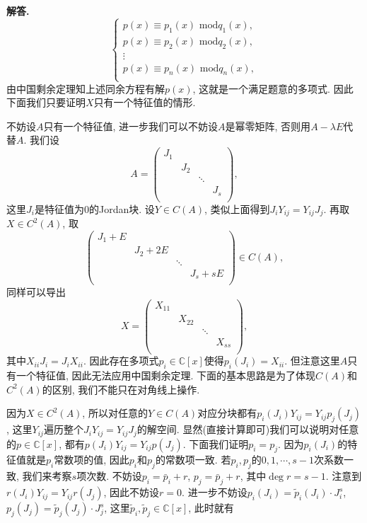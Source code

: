 \documentclass{article}
\newenvironment{solution}{\par\noindent\textbf{解答. }}{\par}
\begin{document}
\begin{solution}
$$
\begin{cases}
	p\left( x \right) \equiv p_1\left( x \right) \,\,\mathrm{mod}q_1\left( x \right) ,\\
	p\left( x \right) \equiv p_2\left( x \right) \,\,\mathrm{mod}q_2\left( x \right) ,\\
	\vdots\\
	p\left( x \right) \equiv p_n\left( x \right) \,\,\mathrm{mod}q_n\left( x \right) ,\\
\end{cases}
$$
由中国剩余定理知上述同余方程有解$p(x)$, 这就是一个满足题意的多项式. 因此下面我们只要证明$X$只有一个特征值的情形.\par
不妨设$A$只有一个特征值, 进一步我们可以不妨设$A$是幂零矩阵, 否则用$A-\lambda E$代替$A$. 我们设
$$
A=\left( \begin{matrix}
	J_1&		&		&		\\
	&		J_2&		&		\\
	&		&		\ddots&		\\
	&		&		&		J_s\\
\end{matrix} \right) ,
$$
这里$J_i$是特征值为$0$的Jordan块. 设$Y\in C(A)$, 类似上面得到$J_iY_{ij}=Y_{ij}J_j$. 再取$X\in C^2(A)$, 取
$$
\left( \begin{matrix}
	J_1+E&		&		&		\\
	&		J_2+2E&		&		\\
	&		&		\ddots&		\\
	&		&		&		J_s+sE\\
\end{matrix} \right) \in C\left( A \right) ,
$$
同样可以导出
$$
X=\left( \begin{matrix}
	X_{11}&		&		&		\\
	&		X_{22}&		&		\\
	&		&		\ddots&		\\
	&		&		&		X_{ss}\\
\end{matrix} \right) ,
$$
其中$X_{ii}J_i=J_iX_{ii}$. 因此存在多项式$p_i\in\mathbb{C}[x]$使得$p_i(J_i)=X_{ii}$. 但注意这里$A$只有一个特征值, 因此无法应用中国剩余定理. 下面的基本思路是为了体现$C(A)$和$C^2(A)$的区别, 我们不能只在对角线上操作.\par
因为$X\in C^2(A)$, 所以对任意的$Y\in C(A)$对应分块都有$p_i(J_i)Y_{ij}=Y_{ij}p_j(J_j)$, 这里$Y_{ij}$遍历整个$J_iY_{ij}=Y_{ij}J_j$的解空间. 显然(直接计算即可)我们可以说明对任意的$p\in\mathbb{C}[x]$, 都有$p(J_i)Y_{ij}=Y_{ij}p(J_j)$. 下面我们证明$p_i=p_j$. 因为$p_i(J_i)$的特征值就是$p_i$常数项的值, 因此$p_i$和$p_j$的常数项一致. 若$p_i,p_j$的$0,1,\cdots,s-1$次系数一致, 我们来考察$s$项次数. 不妨设$p_i=\bar{p}_i+r$, $p_j=\bar{p}_j+r$, 其中$\deg r=s-1$. 注意到$r(J_i)Y_{ij}=Y_{ij}r(J_j)$, 因此不妨设$r=0$. 进一步不妨设$p_i(J_i)=\tilde{p}_i(J_i)\cdot J_i^s$, $p_j(J_j)=\tilde{p}_j(J_j)\cdot J_j^s$, 这里$\tilde{p}_i,\tilde{p}_j\in\mathbb{C}[x]$, 此时就有

\end{solution}
\end{document}
